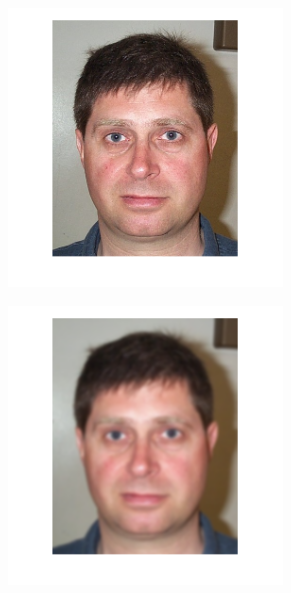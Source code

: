 \begin{figure}[H]
\centering
\begin{subfigure}{.30\textwidth}
  \centering
  \includegraphics[width=0.8\textwidth]{img/blur_test/orig_img.png}
  \caption{}
\end{subfigure}%
\begin{subfigure}{.30\textwidth}
  \centering
  \includegraphics[width=0.8\textwidth]{img/blur_test/gauss_img.png}
  \caption{}
\end{subfigure}%
\begin{subfigure}{.30\textwidth}
  \centering

\end{subfigure}
\end{figure}
